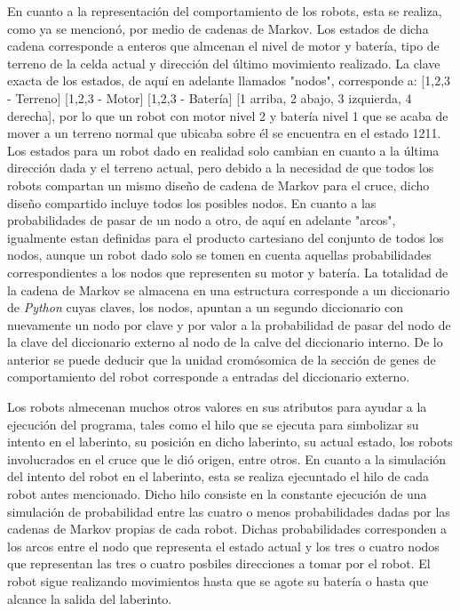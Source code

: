 \documentclass[conference]{IEEEtran}
\begin{document}
En cuanto a la representación del comportamiento de los robots, esta se realiza, como ya se mencionó, por medio de cadenas de Markov. Los estados de dicha cadena corresponde a enteros que almcenan el nivel de motor y batería, tipo de terreno de la celda actual y dirección del último movimiento realizado. La clave exacta de los estados, de aquí en adelante llamados "nodos", corresponde a: [1,2,3 - Terreno] [1,2,3 - Motor] [1,2,3 - Batería] [1 arriba, 2 abajo, 3 izquierda, 4 derecha], por lo que un robot con motor nivel 2 y batería nivel 1 que se acaba de mover a un terreno normal que ubicaba sobre él se encuentra en el estado 1211. Los estados para un robot dado en realidad solo cambian en cuanto a la última dirección dada y el terreno actual, pero debido a la necesidad de que todos los robots compartan un mismo diseño de cadena de Markov para el cruce, dicho diseño compartido incluye todos los posibles nodos. En cuanto a las probabilidades de pasar de un nodo a otro, de aquí en adelante "arcos", igualmente estan definidas para el producto cartesiano del conjunto de todos los nodos, aunque un robot dado solo se tomen en cuenta aquellas probabilidades correspondientes a los nodos que representen su motor y batería. La totalidad de la cadena de Markov se almacena en una estructura corresponde a un diccionario de \textit{Python} cuyas claves, los nodos, apuntan a un segundo diccionario con nuevamente un nodo por clave y por valor a la probabilidad de pasar del nodo de la clave del diccionario externo al nodo de la calve del diccionario interno. De lo anterior se puede deducir que la unidad cromósomica de la sección de genes de comportamiento del robot corresponde a entradas del diccionario externo.

Los robots almecenan muchos otros valores en sus atributos para ayudar a la ejecución del programa, tales como el hilo que se ejecuta para simbolizar su intento en el laberinto, su posición en dicho laberinto, su actual estado, los robots involucrados en el cruce que le dió origen, entre otros. En cuanto a la simulación del intento del robot en el laberinto, esta se realiza ejecuntado el hilo de cada robot antes mencionado. Dicho hilo consiste en la constante ejecución de una simulación de probabilidad entre las cuatro o menos probabilidades dadas por las cadenas de Markov propias de cada robot. Dichas probabilidades corresponden a los arcos entre el nodo que representa el estado actual y los tres o cuatro nodos que representan las tres o cuatro posbiles direcciones a tomar por el robot. El robot sigue realizando movimientos hasta que se agote su batería o hasta que alcance la salida del laberinto. 
\end{document}
